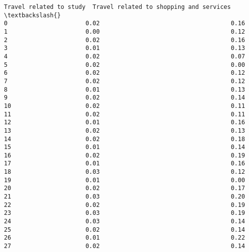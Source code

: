 \documentclass[11pt]{article}
\begin{document}
\begin{Verbatim}[commandchars=\\\{\}]
    Travel related to study  Travel related to shopping and services  \textbackslash{}
0                      0.02                                     0.16   
1                      0.00                                     0.12   
2                      0.02                                     0.16   
3                      0.01                                     0.13   
4                      0.02                                     0.07   
5                      0.02                                     0.00   
6                      0.02                                     0.12   
7                      0.02                                     0.12   
8                      0.01                                     0.13   
9                      0.02                                     0.14   
10                     0.02                                     0.11   
11                     0.02                                     0.11   
12                     0.01                                     0.16   
13                     0.02                                     0.13   
14                     0.02                                     0.18   
15                     0.01                                     0.14   
16                     0.02                                     0.19   
17                     0.01                                     0.16   
18                     0.03                                     0.12   
19                     0.01                                     0.00   
20                     0.02                                     0.17   
21                     0.03                                     0.20   
22                     0.02                                     0.19   
23                     0.03                                     0.19   
24                     0.03                                     0.14   
25                     0.02                                     0.14   
26                     0.01                                     0.22   
27                     0.02                                     0.14   


\end{Verbatim}
\end{document}
